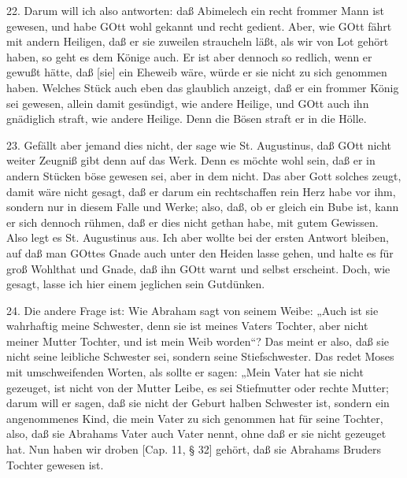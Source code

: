 22. Darum will ich also antworten: daß Abimelech ein recht frommer Mann ist gewesen, und habe GOtt wohl gekannt und recht gedient. Aber, wie GOtt fährt mit andern Heiligen, daß er sie zuweilen straucheln läßt, als wir von Lot gehört haben, so geht es dem Könige auch. Er ist aber dennoch so redlich, wenn er gewußt hätte, daß [sie] ein Eheweib wäre, würde er sie nicht zu sich genommen haben. Welches Stück auch eben das glaublich anzeigt, daß er ein frommer König sei gewesen, allein damit gesündigt, wie andere Heilige, und GOtt auch ihn gnädiglich straft, wie andere Heilige. Denn die Bösen straft er in die Hölle.

23. Gefällt aber jemand dies nicht, der sage wie St. Augustinus, daß GOtt nicht weiter Zeugniß gibt denn auf das Werk. Denn es möchte wohl sein, daß er in andern Stücken böse gewesen sei, aber in dem nicht. Das aber Gott solches zeugt, damit wäre nicht gesagt, daß er darum ein rechtschaffen rein Herz habe vor ihm, sondern nur in diesem Falle und Werke; also, daß, ob er gleich ein Bube ist, kann er sich dennoch rühmen, daß er dies nicht gethan habe, mit gutem Gewissen. Also legt es St. Augustinus aus. Ich aber wollte bei der ersten Antwort bleiben, auf daß man GOttes Gnade auch unter den Heiden lasse gehen, und halte es für groß Wohlthat und Gnade, daß ihn GOtt warnt und selbst erscheint. Doch, wie gesagt, lasse ich hier einem jeglichen sein Gutdünken.

24. Die andere Frage ist: Wie Abraham sagt von seinem Weibe: „Auch ist sie wahrhaftig meine Schwester, denn sie ist meines Vaters Tochter, aber nicht meiner Mutter Tochter, und ist mein Weib worden“? Das meint er also, daß sie nicht seine leibliche Schwester sei, sondern seine Stiefschwester. Das redet Moses mit umschweifenden Worten, als sollte er sagen: „Mein Vater hat sie nicht gezeuget, ist nicht von der Mutter Leibe, es sei Stiefmutter oder rechte Mutter; darum will er sagen, daß sie nicht der Geburt halben Schwester ist, sondern ein angenommenes Kind, die mein Vater zu sich genommen hat für seine Tochter, also, daß sie Abrahams Vater auch Vater nennt, ohne daß er sie nicht gezeuget hat. Nun haben wir droben [Cap. 11, § 32] gehört, daß sie Abrahams Bruders Tochter gewesen ist.


